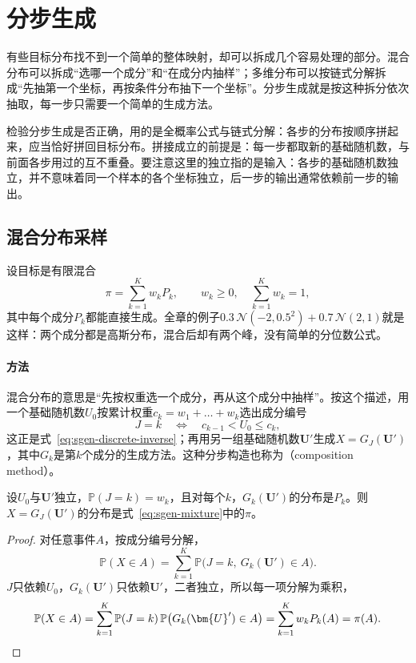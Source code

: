 \section{分步生成}
\label{sec:sgen-sequential}

有些目标分布找不到一个简单的整体映射，却可以拆成几个容易处理的部分。混合分布可以拆成“选哪一个成分”和“在成分内抽样”；多维分布可以按链式分解拆成“先抽第一个坐标，再按条件分布抽下一个坐标”。分步生成就是按这种拆分依次抽取，每一步只需要一个简单的生成方法。

检验分步生成是否正确，用的是全概率公式与链式分解：各步的分布按顺序拼起来，应当恰好拼回目标分布。拼接成立的前提是：每一步都取新的基础随机数，与前面各步用过的互不重叠。要注意这里的独立指的是输入：各步的基础随机数独立，并不意味着同一个样本的各个坐标独立，后一步的输出通常依赖前一步的输出。

\subsection{混合分布采样}
\label{sec:sgen-mixture}

设目标是有限混合
\begin{equation}
  \pi=\sum_{k=1}^{K}w_kP_k,\qquad w_k\ge0,\quad \sum_{k=1}^{K}w_k=1,
  \label{eq:sgen-mixture}
\end{equation}
其中每个成分$P_k$都能直接生成。全章的例子$0.3\,\mathcal{N}(-2,0.5^{2})+0.7\,\mathcal{N}(2,1)$就是这样：两个成分都是高斯分布，混合后却有两个峰，没有简单的分位数公式。

\paragraph{方法}
混合分布的意思是“先按权重选一个成分，再从这个成分中抽样”。按这个描述，用一个基础随机数$U_0$按累计权重$c_k=w_1+\dots+w_k$选出成分编号
\[
  J=k\quad\Longleftrightarrow\quad c_{k-1}<U_0\le c_k ,
\]
这正是式~\eqref{eq:sgen-discrete-inverse}；再用另一组基础随机数$\bm{U}'$生成$X=G_J(\bm{U}')$，其中$G_k$是第$k$个成分的生成方法。这种分步构造也称为（composition method）。

\begin{theorem}[混合分布采样]
\label{thm:sgen-mixture}
设$U_0$与$\bm{U}'$独立，$\mathbb{P}(J=k)=w_k$，且对每个$k$，$G_k(\bm{U}')$的分布是$P_k$。则$X=G_J(\bm{U}')$的分布是式~\eqref{eq:sgen-mixture}中的$\pi$。
\end{theorem}

\begin{proof}
对任意事件$A$，按成分编号分解，
\[
  \mathbb{P}(X\in A)=\sum_{k=1}^{K}\mathbb{P}\bigl(J=k,\ G_k(\bm{U}')\in A\bigr).
\]
$J$只依赖$U_0$，$G_k(\bm{U}')$只依赖$\bm{U}'$，二者独立，所以每一项分解为乘积，
\[
  \mathbb{P}(X\in A)=\sum_{k=1}^{K}\mathbb{P}(J=k)\,\mathbb{P}\bigl(G_k(\bm{U}')\in A\bigr)=\sum_{k=1}^{K}w_kP_k(A)=\pi(A). \qedhere
\]
\end{proof}

